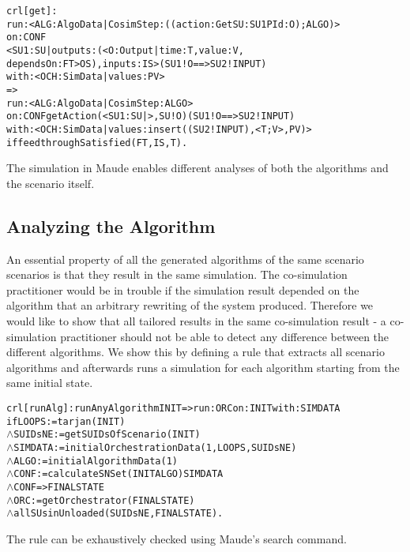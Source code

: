 \begin{alltt}
\small
crl [get] : 
run: < ALG : AlgoData | CosimStep : ((action: Get SU: SU1 PId: O) ; ALGO) >
on: CONF
< SU1 : SU | outputs : (< O : Output | time : T, value : V, 
  dependsOn : FT > OS), inputs : IS > ( SU1 ! O ==> SU2 ! INPUT)
with: < OCH : SimData | values : PV >
=> 
run: < ALG : AlgoData | CosimStep : ALGO >
on: CONF getAction(< SU1 : SU | >, SU ! O) ( SU1 ! O ==> SU2 ! INPUT)
with: < OCH : SimData | values : insert((SU2 ! INPUT), < T ; V >, PV) > 
if feedthroughSatisfied(FT, IS, T) .
\end{alltt}

The simulation in Maude enables different analyses of both the algorithms and the scenario itself.

\subsection{Analyzing the Algorithm}
An essential property of all the generated algorithms of the same scenario scenarios is that they result in the same simulation.
The co-simulation practitioner would be in trouble if the simulation result depended on the algorithm that an arbitrary rewriting of the system produced.
Therefore we would like to show that all tailored results in the same co-simulation result - a co-simulation practitioner should not be able to detect any difference between the different algorithms.
We show this by defining a rule that extracts all scenario algorithms and afterwards runs a simulation for each algorithm starting from the same initial state.

\begin{alltt}
  \small
crl [runAlg] : runAnyAlgorithm INIT => run: ORC on: INIT with: SIMDATA
  if LOOPS := tarjan(INIT)
  \(\land\) SUIDsNE := getSUIDsOfScenario(INIT)
  \(\land\) SIMDATA := initialOrchestrationData(1,LOOPS,SUIDsNE)
  \(\land\) ALGO := initialAlgorithmData(1)
  \(\land\) CONF := calculateSNSet(INIT ALGO) SIMDATA 
  \(\land\) {CONF} => { FINALSTATE } 
  \(\land\) ORC := getOrchestrator(FINALSTATE)
  \(\land\) allSUsinUnloaded(SUIDsNE, FINALSTATE) .
\end{alltt}

The rule can be exhaustively checked using Maude's search command.



